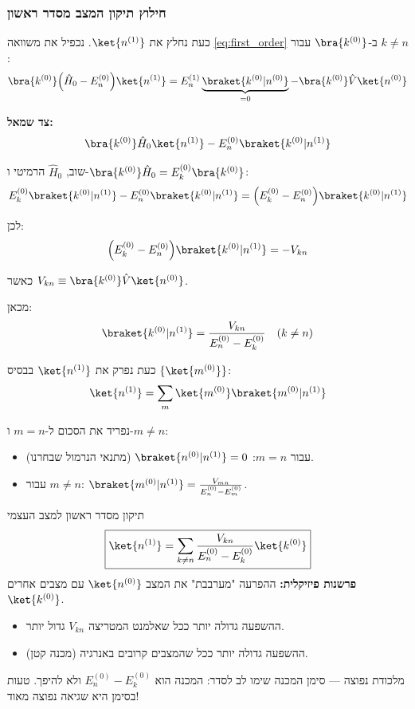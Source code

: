 \subsubsection{חילוץ תיקון המצב מסדר ראשון}

כעת נחלץ את $\ket{n^{(1)}}$. נכפיל את משוואה \eqref{eq:first_order} ב-$\bra{k^{(0)}}$ עבור $k \neq n$:
\[
\bra{k^{(0)}}\Big(\hat{H}_0 - E_n^{(0)}\Big)\ket{n^{(1)}} = E_n^{(1)}\underbrace{\braket{k^{(0)}|n^{(0)}}}_{=0} - \bra{k^{(0)}}\hat{V}\ket{n^{(0)}}
\]

\textbf{צד שמאל:}
\[
\bra{k^{(0)}}\hat{H}_0\ket{n^{(1)}} - E_n^{(0)}\braket{k^{(0)}|n^{(1)}}
\]

שוב, $\hat{H}_0$ הרמיטי ו-$\bra{k^{(0)}}\hat{H}_0 = E_k^{(0)}\bra{k^{(0)}}$:
\[
E_k^{(0)}\braket{k^{(0)}|n^{(1)}} - E_n^{(0)}\braket{k^{(0)}|n^{(1)}} = \Big(E_k^{(0)} - E_n^{(0)}\Big)\braket{k^{(0)}|n^{(1)}}
\]

לכן:
\[
\Big(E_k^{(0)} - E_n^{(0)}\Big)\braket{k^{(0)}|n^{(1)}} = -V_{kn}
\]

כאשר $V_{kn} \equiv \bra{k^{(0)}}\hat{V}\ket{n^{(0)}}$.

מכאן:
\[
\braket{k^{(0)}|n^{(1)}} = \frac{V_{kn}}{E_n^{(0)} - E_k^{(0)}} \quad (k \neq n)
\]

כעת נפרק את $\ket{n^{(1)}}$ בבסיס $\{\ket{m^{(0)}}\}$:
\[
\ket{n^{(1)}} = \sum_m \ket{m^{(0)}}\braket{m^{(0)}|n^{(1)}}
\]

נפריד את הסכום ל-$m=n$ ו-$m \neq n$:
\begin{itemize}
\item עבור $m = n$: $\braket{n^{(0)}|n^{(1)}} = 0$ (מתנאי הנרמול שבחרנו).
\item עבור $m \neq n$: $\braket{m^{(0)}|n^{(1)}} = \frac{V_{mn}}{E_n^{(0)} - E_m^{(0)}}$.
\end{itemize}

\begin{resultbox}{תיקון מסדר ראשון למצב העצמי}
\[
\boxed{\ket{n^{(1)}} = \sum_{k\neq n} \frac{V_{kn}}{E_n^{(0)}-E_k^{(0)}}\ket{k^{(0)}}}
\]
\textbf{פרשנות פיזיקלית:} ההפרעה "מערבבת" את המצב $\ket{n^{(0)}}$ עם מצבים אחרים $\ket{k^{(0)}}$. 
\begin{itemize}
\item ההשפעה גדולה יותר ככל שאלמנט המטריצה $V_{kn}$ גדול יותר.
\item ההשפעה גדולה יותר ככל שהמצבים קרובים באנרגיה (מכנה קטן).
\end{itemize}
\end{resultbox}

\begin{notebox}{מלכודת נפוצה — סימן המכנה}
שימו לב לסדר: המכנה הוא $E_n^{(0)} - E_k^{(0)}$ ולא להיפך. טעות בסימן היא שגיאה נפוצה מאוד!
\end{notebox}


